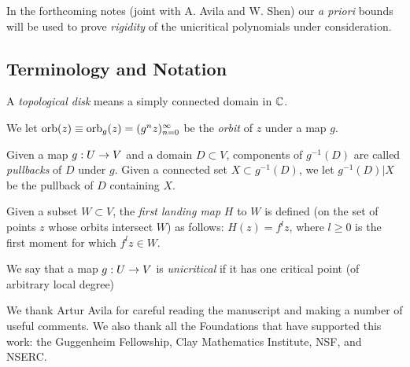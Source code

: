 \ssk In the forthcoming notes (joint with A. Avila and W. Shen)
      our {\it a priori} bounds will be used to prove {\it rigidity} of the 
      unicritical polynomials under consideration.

\subsection{Terminology and Notation}   

  A {\it topological disk} means a simply connected  domain in ${\Bbb C}$.
 
  We let $\operatorname{orb}(z)\equiv \operatorname{orb}_g(z)= (g^n z)_{n=0}^\infty$ be the {\it orbit} of $z$ under a map $g$.

  Given a map $g: U\rightarrow V$ and a domain $D\subset V$, 
components of $g^{-1}(D)$ are called {\it pullbacks}  of $D$ under $g$. 
Given a connected set $X\subset g^{-1}(D)$, we let $g^{-1} (D)|X$ be the pullback of $D$
containing $X$.    

Given a subset $W\subset V$, the {\it first landing map} $H$ to $W$ is defined (on the set of points $z$
whose orbits intersect $W$) as follows:  $H(z)= f^l z$, where $l\geq 0$ is the first moment for which
$f^l z\in W$.

We say that a map $g: U\rightarrow V$ is {\it unicritical} if it has one critical point
(of arbitrary local degree)


 We thank Artur Avila for careful reading the manuscript and making a number of useful comments.
We also thank all the Foundations that have supported this work: 
the Guggenheim Fellowship, Clay Mathematics Institute, NSF, and NSERC.

